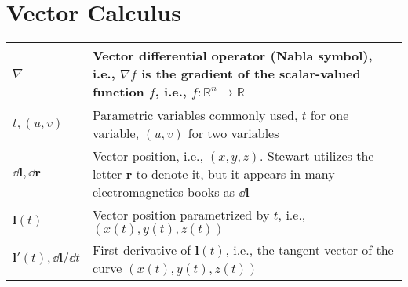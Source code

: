 \documentclass{article}
\begin{document}
\section{Vector Calculus}
\begin{xltabular}{\textwidth}{XX}
	\(\nabla\)                                                                                                                                                                                                                                 & Vector differential operator (Nabla symbol), i.e., \(\nabla f\) is the gradient of the scalar-valued function \(f\), i.e., \(f: \mathbb{R}^n \rightarrow \mathbb{R}\)                                                                                   \\ \hline
	\(t, (u,v)\)                                                                                                                                                                                                                               & Parametric variables commonly used, \(t\) for one variable, \((u,v)\) for two variables\cite{stewartCalculus2011}                                                                                                                                       \\ \hline
	\(\dd{\mathbf{l}}, \dd{\mathbf{r}}\)                                                                                                                                                                                                       & Vector position, i.e., \((x, y, z)\). Stewart \cite{stewartCalculus2011} utilizes the letter \(\mathbf{r}\) to denote it, but it appears in many electromagnetics books as \(\dd{\mathbf{l}}\)                                                          \\ \hline
	\(\mathbf{l}(t)\)                                                                                                                                                                                                                          & Vector position parametrized by \(t\), i.e., \((x(t), y(t), z(t))\) \cite{stewartCalculus2011,ramoFieldsWavesCommunication1994}                                                                                                                         \\ \hline
	\(\mathbf{l}'(t), \dd{\mathbf{l}}/\dd{t}\)                                                                                                                                                                                                 & First derivative of \(\mathbf{l}(t)\), i.e., the tangent vector of the curve \((x(t), y(t), z(t))\) \cite{stewartCalculus2011}                                                                                                                          \\ \hline

\end{xltabular}
\end{document}
